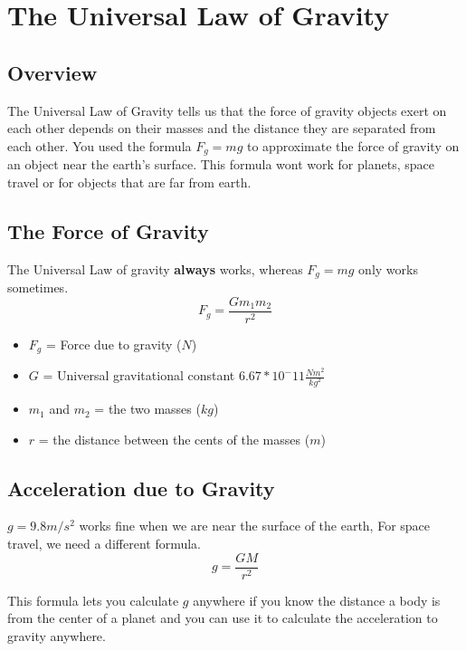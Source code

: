 \section{The Universal Law of Gravity}

\subsection{Overview}
The Universal Law of Gravity tells us that the force of gravity objects exert on each other depends on their masses and the distance they are separated from each other. You used the formula $F_g=mg$ to approximate the force of gravity on an object near the earth's surface. This formula wont work for planets, space travel or for objects that are far from earth.

\subsection{The Force of Gravity}
The Universal Law of gravity \textbf{always} works, whereas $F_g=mg$ only works sometimes. \[F_g=\frac{Gm_1m_2}{r^2}\]
\begin{itemize}
	\item $F_g$ = Force due to gravity ($N$)
	\item $G$ = Universal gravitational constant $6.67*10^-11\frac{Nm^2}{kg^2}$
	\item $m_1$ and $m_2$ = the two masses ($kg$)
	\item $r$ = the distance between the cents of the masses ($m$)
\end{itemize}

\subsection{Acceleration due to Gravity}
$g=9.8m/s^2$ works fine when we are near the surface of the earth, For space travel, we need a different formula. \[g=\frac{GM}{r^2}\] 

This formula lets you calculate $g$ anywhere if you know the distance a body is from the center of a planet and you can use it to calculate the acceleration to gravity anywhere.